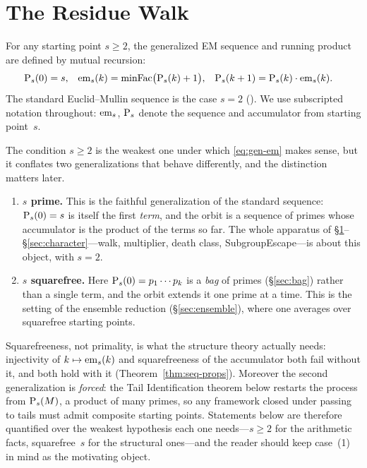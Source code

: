 \section{The Residue Walk}
\label{sec:walk}
\label{sec:bootstrap}

For any starting point $s \geq 2$, the generalized EM sequence and
running product are defined by mutual recursion:
\begin{align}
	\mathrm{P}_{s}(0) &= s, &
	\mathrm{em}_{s}(k) &= \mathrm{minFac}\bigl(\mathrm{P}_{s}(k)+1\bigr), &
	\mathrm{P}_{s}(k+1) &= \mathrm{P}_{s}(k) \cdot \mathrm{em}_{s}(k).
	\label{eq:gen-em}
\end{align}
The standard Euclid--Mullin sequence is the case $s = 2$
().
We use subscripted notation throughout: $\mathrm{em}_{s}$, $\mathrm{P}_{s}$ denote
the sequence and accumulator from starting point~$s$.

\begin{remark}
\label{rem:two-generalizations}
The condition $s \geq 2$ is the weakest one under which
\eqref{eq:gen-em} makes sense, but it conflates two generalizations
that behave differently, and the distinction matters later.

\begin{enumerate}[nosep,leftmargin=*]
\item \textbf{$s$ prime.}  This is the faithful generalization of the
  standard sequence: $\mathrm{P}_{s}(0) = s$ is itself the first \emph{term},
  and the orbit is a sequence of primes whose accumulator is the product
  of the terms so far.  The whole apparatus of
  \S\ref{sec:walk}--\S\ref{sec:character}---walk, multiplier,
  death class, SubgroupEscape---is about this object, with $s = 2$.
\item \textbf{$s$ squarefree.}  Here $\mathrm{P}_{s}(0) = p_1 \cdots p_k$ is a
  \emph{bag} of primes (\S\ref{sec:bag}) rather than a single term, and
  the orbit extends it one prime at a time.  This is the setting of the
  ensemble reduction (\S\ref{sec:ensemble}), where one averages over
  squarefree starting points.
\end{enumerate}

\noindent
Squarefreeness, not primality, is what the structure theory actually
needs: injectivity of $k \mapsto \mathrm{em}_{s}(k)$ and squarefreeness of the
accumulator both fail without it, and both hold with it
(Theorem~\ref{thm:seq-props}).  Moreover the second generalization is
\emph{forced}: the Tail Identification theorem below restarts the
process from $\mathrm{P}_{s}(M)$, a product of many primes, so any framework
closed under passing to tails must admit composite starting points.
Statements below are therefore quantified over the weakest hypothesis
each one needs---$s \geq 2$ for the arithmetic facts, squarefree~$s$ for
the structural ones---and the reader should keep case~(1) in mind as the
motivating object.
\end{remark}

